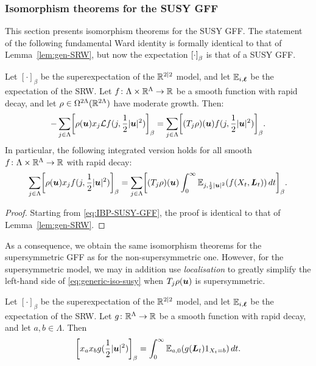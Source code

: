 \documentclass[11pt,a4paper]{article}
\begin{document}
\subsubsection{Isomorphism theorems for the SUSY GFF}
\label{sec:isom-theor-susy}

This section presents isomorphism theorems for the SUSY GFF.
The statement of the following
fundamental Ward identity is formally identical to that of
Lemma~\ref{lem:gen-SRW}, but
now the expectation $\cb{\cdot}_{\beta}$ is that of a SUSY GFF.

\begin{lemma}
  \label{lem:gen-SUSY-SRW}
  Let $[\cdot]_\beta$ be the superexpectation of the $\mathbb{R}^{2|2}$ model, and let $\mathbb{E}_{i,\boldsymbol{\ell}}$ be the expectation of the SRW.
  Let $f\colon \Lambda\times \mathbb{R}^{\Lambda} \to \mathbb{R}$ be a smooth function
  with rapid decay, and let $\rho\in \Omega^{2\Lambda}(\mathbb{R}^{2\Lambda})$
  have moderate growth.  Then:
  \begin{equation}
    \label{eq:gen-lem-susy}
    -\sum_{j\in\Lambda}\cb{\rho(\V{u})x_{j} \cL f(j, \frac{1}{2} |\V{u}|^{2})}_{\beta}
    =
    \sum_{j\in\Lambda} \cb{(T_j\rho)(\V{u})f(j,\frac{1}{2}|\V{u}|^{2})}_{\beta}
    .
  \end{equation}
  In particular, the following integrated version holds for all smooth
  $f\colon\Lambda\times\mathbb{R}^{\Lambda}\to\mathbb{R}$ with rapid decay:
  \begin{equation}
    \label{eq:generic-iso-susy}
    \sum_{j\in\Lambda}\uspin{\rho(\V{u})x_{j} f(j, \frac{1}{2} |\V{u}|^{2})}_{\beta}
    =
    \sum_{j\in\Lambda} \uspin{(T_j\rho)(\V{u})\int_0^\infty
      \E_{j,\frac{1}{2}|\V{u}|^2}(f(X_t,\V{L}_t))\,dt}_{\beta}
    .
  \end{equation}
\end{lemma}
\begin{proof}
  Starting from \eqref{eq:IBP-SUSY-GFF},
  the proof is identical to that of Lemma~\ref{lem:gen-SRW}.
\end{proof}

As a consequence, we obtain the same isomorphism theorems for the
supersymmetric GFF as for the non-supersymmetric one. However, for the
supersymmetric model, we may in addition use \emph{localisation} to
greatly simplify the left-hand side of \eqref{eq:generic-iso-susy}
when $T_j\rho(\boldsymbol{u})$ is supersymmetric.

\begin{theorem}
  \label{thm:susy-BFSD}
  Let $[\cdot]_\beta$ be the superexpectation of the $\mathbb{R}^{2|2}$ model, and let $\mathbb{E}_{i,\boldsymbol{\ell}}$ be the expectation of the SRW.
  Let $g\colon \mathbb{R}^{\Lambda}\to \mathbb{R}$ be a smooth function
  with rapid decay, and let $a,b\in\Lambda$. Then
  \begin{equation}
    \label{eq:susy-BFSD}
    \uspin{x_{a}x_{b}g(\frac{1}{2}|\V{u}|^{2})}_{\beta}
    = \int_{0}^{\infty} \E_{a,0}(g(\V{L}_{t})1_{X_t = b})\, dt.
  \end{equation}
\end{theorem}
\end{document}
